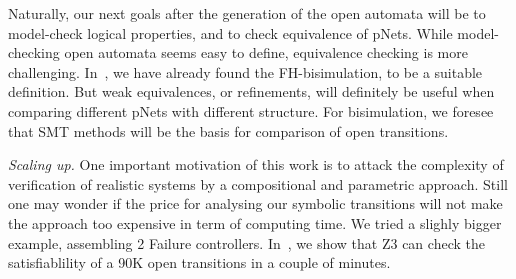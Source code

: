 \documentclass[smallcondensed]{svjour3}
\newcommand{\todoMargin}[2][color=red!60, size=\tiny]{\todo[#1]{{\bf
      ToDo: } {#2}}}
\begin{document}

%
Naturally, our next goals after the generation of the open automata
will be to model-check logical properties, and to check equivalence of pNets. While
model-checking open automata  seems easy to define, equivalence
checking is more challenging. 
In~\cite{henrio:Forte2016}, we
have already found the FH-bisimulation, %
to be a
suitable definition. But weak equivalences, or refinements, will
definitely be useful when comparing different pNets with
different structure. For bisimulation, we foresee that SMT methods
will be the basis for comparison of open transitions. 

\emph{Scaling up.} One important motivation of this work is to
attack the complexity of verification of realistic systems by a
compositional and parametric approach. Still one may wonder if the price
for analysing our symbolic transitions will not make the approach too expensive
in term of computing time. We tried a
slighly bigger example, assembling 2 Failure controllers. In~\cite{Avocs-RR}, we show that Z3 can check the
satisfiablility of a 90K open transitions in a couple of minutes.





% 

\end{document}
